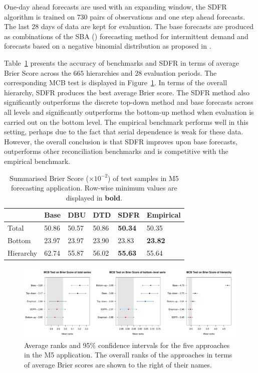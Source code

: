 \documentclass[a4paper,review,11pt,authoryear]{elsarticle}
\theoremstyle{definition}
\begin{document}
     One-day ahead forecasts are used with an expanding window, the SDFR algorithm is trained on $730$ pairs of observations and one step ahead forecasts. The last $28$ days of data are kept for evaluation. The base forecasts are produced as combinations of the SBA (\citealp{syntetosAccuracyIntermittentDemand2005}) forecasting method for intermittent demand and forecasts based on a negative binomial distribution as proposed in \cite{kolassaEvaluatingPredictiveCount2016}.

    Table~\ref{tab:M5} presents the accuracy of benchmarks and SDFR in terms of average Brier Score across the $665$ hierarchies and $28$ evaluation periods. The corresponding MCB test is displayed in Figure~\ref{fig:application_M5}. In terms of the overall hierarchy, SDFR produces the best average Brier score. The SDFR method also significantly outperforms the discrete top-down method and base forecasts across all levels and significantly outperforms the bottom-up method when evaluation is carried out on the bottom level. The empirical benchmark performs well in this setting, perhaps due to the fact that serial dependence is weak for these data. However, the overall conclusion is that SDFR improves upon base forecasts, outperforms other reconciliation benchmarks and is competitive with the empirical benchmark.
   
    \begin{table}
        \centering
        \begin{tabular}{llllll}\toprule
            ~ & Base & DBU & DTD & SDFR & Empirical \\ \midrule
            Total & 50.86 & 50.57 & 50.86 & \textbf{50.34} & 50.35 \\ 
            Bottom & 23.97 & 23.97 & 23.90 & 23.83 & \textbf{23.82} \\ 
            Hierarchy & 62.74 & 55.87 & 56.02 & \textbf{55.63} & 55.64 \\ \bottomrule
        \end{tabular}
        \caption{\label{tab:M5}Summarised Brier Score ($\times 10^{-2}$) of test samples in M5 forecasting application. Row-wise minimum values are displayed in \textbf{bold}.}
    \end{table}


    \begin{figure}[h]
      \caption{\label{fig:application_M5}Average ranks and 95\% confidence intervals for the five approaches in the M5 application. The overall ranks of the approaches in terms of average Brier scores are shown to the right of their names.}
      \centering
      \includegraphics[width=\textwidth]{figures/M5_mcb.pdf}
    \end{figure}
\end{document}
